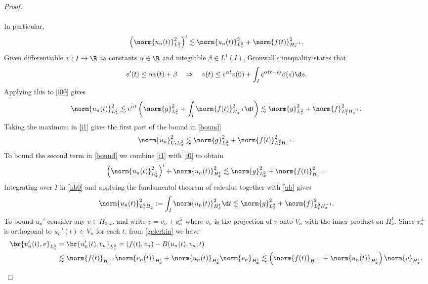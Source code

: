 \documentclass[
    a4paper,
    DIV=14,
    abstract=true,
    numbers=noenddot
]{scrartcl}
\begin{document}
\begin{proof}
\begin{enumerate}[a)]
\begin{align}
       \end{align}
 In particular,
       \begin{align}\label{i00}
         \left(\norm{u_n(t)}_{L_x^2}^2\right)' \lesssim \norm{u_n(t)}^2_{L_x^2} + \norm{f(t)}_{H_x^{-1}}^2.
       \end{align}
 Given differentiable $v:I \to \R$ aa constants $\alpha\in \R$ and integrable $\beta \in L^1(I)$, Gronwall's inequality states that 
       \begin{align*}
 v'(t) \leq \alpha v(t) + \beta \quad \Rightarrow \quad v(t) \leq e^{\alpha t}v(0) + \int_I e^{\alpha(t-s)}\beta(s)\d s.
       \end{align*}
 Applying this to \eqref{i00} gives
       \begin{align}\label{i1}
         \norm{u_n(t)}_{L_x^2}^2 \lesssim e^{\alpha t}\left(\norm{g}_{L_x^2}^2 + \int_I \norm{f(t)}^2_{ H_x^{-1}}\d t\right) \lesssim \norm{g}_{L_x^2}^2 + \norm{f}_{L^2_t H_x^{-1}}^2.
       \end{align}
 Taking the maximum in \eqref{i1}  gives the first part of the bound in \eqref{bound}
       \begin{align}\label{ub}
         \norm{u_n}^2_{C_t L_x^2} \lesssim \norm{g}^2_{L_x^2} + \norm{f(t)}^2_{L^2_t H_x^{-1}}.
       \end{align}
 To bound the second term in \eqref{bound} we combine \eqref{i1} with \eqref{i0} to obtain
       \begin{align}\label{hb0}
         \left(\norm{u_n(t)}_{L_x^2}^2\right)' + \norm{u_n(t)}_{H^1_x}^2 \lesssim \norm{g}^2_{L_x^2} + \norm{f(t)}^2_{H_x^{-1}}.
       \end{align}
 Integrating over $I$ in \eqref{hb0} and applying the fundamental theorem of calculus together with \eqref{ub} gives
       \begin{align}\label{hb}
         \norm{u_n(t)}_{L_t^2H^1_x}^2:= \int_I \norm{u_n(t)}_{H^1_x}^2 \d t \lesssim \norm{g}^2_{L_x^2} + \norm{f}^2_{L^2_t H_x^{-1}}.
       \end{align}
 To bound $u_n'$ consider any $v \in H_{0,x}^1$, and write $v=v_n+v_n^\perp$ where $v_n$ is the projection of $v$ onto $V_n$ with the inner product on $H^1_x$. Since $v_n^\perp$ is orthogonal to $u_n'(t)\in V_n$ for each $t$, from \eqref{galerkin} we have
       \begin{align*}
         \br{u_n'(t),v}_{L^2_x} & = \br{u_n'(t),v_n}_{L^2_x}= (f(t),v_n)- B(u_n(t),v_n;t)                                                                \\
                    & \lesssim \norm{f(t)}_{H_x^{-1}}\norm{v_n(t)}_{H^1_x} + \norm{ u_n(t)}_{H^1_x}\norm{v_n}_{H^1_x} \lesssim \left(\norm{f(t)}_{H_x^{-1}} + \norm{ u_n(t)}_{H^1_x}\right)\norm{v}_{H^1_x},

\end{align*}
\end{enumerate}
\end{proof}
\end{document}
